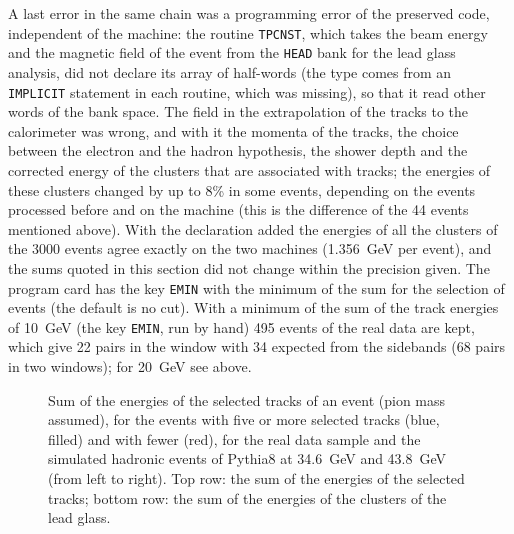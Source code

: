 A last error in the same chain was a programming error of the preserved code, independent of the machine: the routine \texttt{TPCNST}, which takes the beam energy and the magnetic field of the event from the \texttt{HEAD} bank for the lead glass analysis, did not declare its array of half-words (the type comes from an \texttt{IMPLICIT} statement in each routine, which was missing), so that it read other words of the bank space. The field in the extrapolation of the tracks to the calorimeter was wrong, and with it the momenta of the tracks, the choice between the electron and the hadron hypothesis, the shower depth and the corrected energy of the clusters that are associated with tracks; the energies of these clusters changed by up to 8\% in some events, depending on the events processed before and on the machine (this is the difference of the 44 events mentioned above). With the declaration added the energies of all the clusters of the 3000 events agree exactly on the two machines (1.356~GeV per event), and the sums quoted in this section did not change within the precision given.
The program card has the key \texttt{EMIN} with
the minimum of the sum for the selection of events (the default is no cut).
With a minimum of the sum of the track energies of 10~GeV (the key \texttt{EMIN}, run by hand) 495 events of the real data are kept, which give 22 pairs in the window with 34 expected from the sidebands (68 pairs in two windows); for 20~GeV see above.

\begin{figure}[H]
\centering
{}
\caption{Sum of the energies of the selected tracks of an event (pion mass assumed), for the events with five or more selected tracks (blue, filled) and with fewer (red), for the real data
sample and the simulated hadronic events of Pythia8 at 34.6~GeV and 43.8~GeV (from left to right). Top row: the sum of the energies of the selected tracks; bottom row: the sum of the energies of the clusters of the lead glass.}
\label{fig:k0senergy}
\end{figure}

